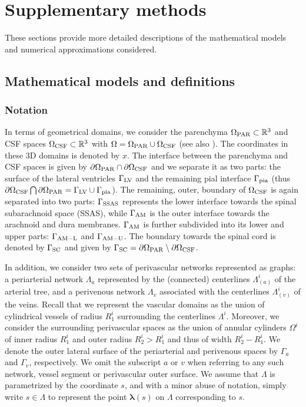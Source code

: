 \section{Supplementary methods}

These sections provide more detailed descriptions of the mathematical
models and numerical approximations considered.

\subsection{Mathematical models and definitions}
\label{sec:more_maths}


\subsubsection{Notation}

In terms of geometrical domains, we consider the parenchyma
$\Omega_{\rm PAR} \subset \mathbb{R}^3$ and CSF spaces $\Omega_{\rm CSF}
\subset \mathbb{R}^3$ with $\Omega = \Omega_{\rm PAR} \cup \Omega_{\rm CSF}$
(see also ). The coordinates in these
3D domains is denoted by $x$. The interface between the parenchyma and
CSF spaces is given by $\partial \Omega_{\rm PAR} \cap \partial
\Omega_{\rm CSF}$ and we separate it as two parts: the surface of the
lateral ventricles $\Gamma_{\rm LV}$ and the remaining pial interface
$\Gamma_{\rm pia}$ (thus $\partial \Omega_{\rm CSF} \bigcap \partial
\Omega_{\rm PAR} = \Gamma_{\rm LV} \cup \Gamma_{\rm pia}$). The
remaining, outer, boundary of $\Omega_{\rm CSF}$ is again separated
into two parts: $\Gamma_{\rm SSAS}$ represents the lower interface
towards the spinal subarachnoid space (SSAS), while $\Gamma_{\rm AM}$
is the outer interface towards the arachnoid and dura
membranes. $\Gamma_{\rm AM}$ is further subdivided into its lower and
upper parts: $\Gamma_{\rm AM-L}$ and $\Gamma_{\rm AM-U}$. The boundary
towards the spinal cord is denoted by $\Gamma_{\rm{SC}}$ and given by
$\Gamma_{\rm{SC}} = \partial \Omega_{\rm PAR} \setminus \partial
\Omega_{\rm CSF}$.


In addition, we consider two sets of perivascular networks represented
as graphs: a periarterial network $\Lambda_a$ represented by the
(connected) centerlines $\Lambda^i_{(a)}$ of the arterial tree, and a
perivenous network $\Lambda_v$ associated with the centerlines
$\Lambda^i_{(v)}$ of the veins. Recall that we represent the vascular
domains as the union of cylindrical vessels of radius $R_1^i$
surrounding the centerlines $\Lambda^i$. Moreover, we consider the
surrounding perivascular spaces as the union of annular cylinders
$\Omega^i$ of inner radius $R_1^i$ and outer radius $R_2^i > R_1^i$
and thus of width $R_2^i - R_1^i$. We denote the outer lateral surface
of the periarterial and perivenous spaces by $\Gamma_a$ and
$\Gamma_v$, respectively. We omit the subscript $a$ or $v$ when
referring to any such network, vessel segment or perivascular outer
surface. We assume that $\Lambda$ is parametrized by the coordinate
$s$, and with a minor abuse of notation, simply write $s \in \Lambda$
to represent the point ${\bm \lambda}(s)$ on $\Lambda$ corresponding
to $s$.

